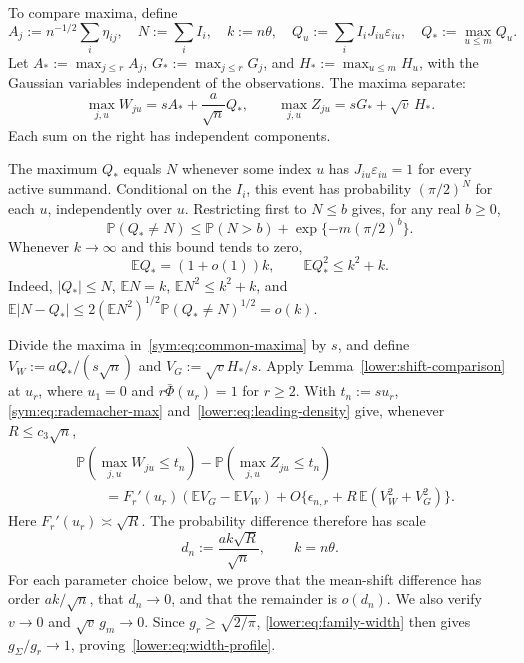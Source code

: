 \documentclass[11pt,letterpaper]{article}
\newenvironment{vSixBlock}{\color{magenta}}{}
\theoremstyle{remark}
\newcommand{\E}{\mathbb E}
\newcommand{\Pp}{\mathbb P}
\begin{document}
\begin{vSixBlock}
To compare maxima, define
\[
 A_j:=n^{-1/2}\sum_i\eta_{ij},\quad
 N:=\sum_i I_i,\quad k:=n\theta,\quad
 Q_u:=\sum_i I_iJ_{iu}\varepsilon_{iu},\quad Q_*:=\max_{u\le m}Q_u.
\]
Let \(A_*:=\max_{j\le r}A_j\), \(G_*:=\max_{j\le r}G_j\),
and \(H_*:=\max_{u\le m}H_u\), with the Gaussian variables
independent of the observations. The maxima separate:
\begin{equation}
 \max_{j,u}W_{ju}=sA_*+\frac a{\sqrt n}Q_*,\qquad
 \max_{j,u}Z_{ju}=sG_*+\sqrt v\,H_*.
 \label{sym:eq:common-maxima}
\end{equation}
Each sum on the right has independent components.

The maximum \(Q_*\) equals \(N\) whenever some index \(u\)
has \(J_{iu}\varepsilon_{iu}=1\) for every active summand.
Conditional on the \(I_i\), this event has probability
\((\pi/2)^N\) for each \(u\), independently over \(u\).
Restricting first to \(N\le b\) gives, for any real \(b\ge0\),
\begin{equation}
 \Pp(Q_*\ne N)\le\Pp(N>b)+\exp\{-m(\pi/2)^b\}.
 \label{lower:eq:all-active}
\end{equation}
Whenever \(k\to\infty\) and this bound tends to zero,
\begin{equation}
 \E Q_*=(1+o(1))k,\qquad \E Q_*^2\le k^2+k.
 \label{lower:eq:activation-moments}
\end{equation}
Indeed, \(|Q_*|\le N\), \(\E N=k\), \(\E N^2\le k^2+k\), and
\(\E|N-Q_*|\le2(\E N^2)^{1/2}\Pp(Q_*\ne N)^{1/2}=o(k)\).

Divide the maxima in~\eqref{sym:eq:common-maxima} by \(s\), and
define \(V_W:=aQ_* /(s\sqrt n)\) and
\(V_G:=\sqrt v H_*/s\). Apply Lemma~\ref{lower:shift-comparison}
at \(u_r\), where \(u_1=0\) and \(r\bar\Phi(u_r)=1\)
for \(r\ge2\). With \(t_n:=su_r\),
\eqref{sym:eq:rademacher-max} and~\eqref{lower:eq:leading-density}
give, whenever \(R\le c_3\sqrt n\),
\begin{equation}
\begin{split}
 &\Pp(\max_{j,u}W_{ju}\le t_n)-\Pp(\max_{j,u}Z_{ju}\le t_n)\\
 &\qquad=F_r'(u_r)(\E V_G-\E V_W)
       +O\{\epsilon_{n,r}+R\,\E(V_W^2+V_G^2)\}.
\end{split}
 \label{lower:eq:master-comparison}
\end{equation}
Here \(F_r'(u_r)\asymp\sqrt R\). The probability difference
therefore has scale
\begin{equation}
 d_n:=\frac{ak\sqrt R}{\sqrt n},\qquad k=n\theta.
 \label{lower:eq:proof-scale}
\end{equation}
For each parameter choice below, we prove that the mean-shift
difference has order \(ak/\sqrt n\), that \(d_n\to0\), and
that the remainder is \(o(d_n)\). We also verify \(v\to0\) and
\(\sqrt v\,g_m\to0\). Since \(g_r\ge\sqrt{2/\pi}\),
\eqref{lower:eq:family-width} then gives
\(g_\Sigma/g_r\to1\), proving~\eqref{lower:eq:width-profile}.


\end{vSixBlock}
\end{document}
